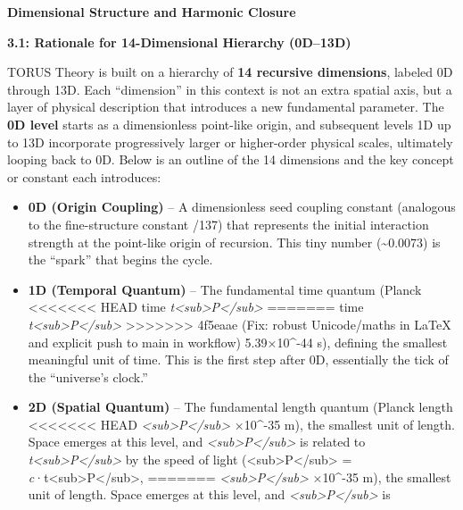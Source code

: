 \documentclass[]{article}
\date{}
\begin{document}
\textbf{Dimensional Structure and Harmonic Closure}

\textbf{3.1: Rationale for 14-Dimensional Hierarchy (0D--13D)}

TORUS Theory is built on a hierarchy of \textbf{14 recursive
dimensions}, labeled 0D through 13D. Each ``dimension'' in this context
is not an extra spatial axis, but a layer of physical description that
introduces a new fundamental parameter. The \textbf{0D level} starts as
a dimensionless point-like origin, and subsequent levels 1D up to 13D
incorporate progressively larger or higher-order physical scales,
ultimately looping back to 0D. Below is an outline of the 14 dimensions
and the key concept or constant each introduces:

\begin{itemize}
\item
  \textbf{0D (Origin Coupling)} -- A dimensionless seed coupling
  constant (analogous to the fine-structure constant \alpha {}/137) that
  represents the initial interaction strength at the point-like origin
  of recursion​. This tiny number (\textasciitilde{}0.0073) is the
  ``spark'' that begins the cycle.
\item
  \textbf{1D (Temporal Quantum)} -- The fundamental time quantum (Planck
<<<<<<< HEAD
  time \emph{t\textless sub\textgreater P\textless/sub\textgreater{}} \approx
=======
  time
  \emph{t\textless{}sub\textgreater{}P\textless{}/sub\textgreater{}} \approx
>>>>>>> 4f5eaae (Fix: robust Unicode/maths in LaTeX and explicit push to main in workflow)
  5.39×10\^{}-44 s), defining the smallest meaningful unit of time. This
  is the first step after 0D, essentially the tick of the ``universe's
  clock.''
\item
  \textbf{2D (Spatial Quantum)} -- The fundamental length quantum
  (Planck length
<<<<<<< HEAD
  \emph{\ell\textless sub\textgreater P\textless/sub\textgreater{}} ×10\^{}-35 m), the smallest unit of length\hspace{0pt}. Space
  emerges at this level, and
  \emph{\ell\textless sub\textgreater P\textless/sub\textgreater{}} is
  related to
  \emph{t\textless sub\textgreater P\textless/sub\textgreater{}} by the
  speed of light
  (\ell\textless sub\textgreater P\textless/sub\textgreater{} =
  \emph{c}·t\textless sub\textgreater P\textless/sub\textgreater,
=======
  \emph{\ell\textless{}sub\textgreater{}P\textless{}/sub\textgreater{}} ×10\^{}-35 m), the smallest unit of length​. Space emerges at
  this level, and
  \emph{\ell\textless{}sub\textgreater{}P\textless{}/sub\textgreater{}} is

\end{itemize}
\end{document}
